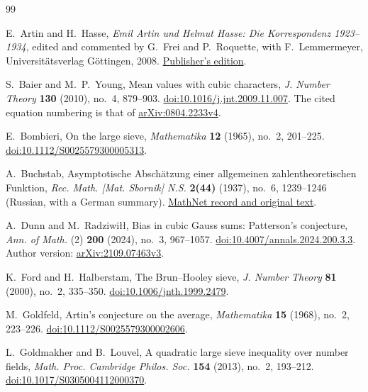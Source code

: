 {}
\begin{thebibliography}{99}
\raggedright
\setlength{\itemsep}{2pt plus 1pt minus 1pt}

E.~Artin and H.~Hasse,
\emph{Emil Artin und Helmut Hasse: Die Korrespondenz 1923--1934},
edited and commented by G.~Frei and P.~Roquette, with F.~Lemmermeyer,
Universit\"atsverlag G\"ottingen, 2008.
\href{https://univerlag.uni-goettingen.de/handle/3/isbn-978-3-940344-50-2}{Publisher's edition}.

S.~Baier and M.~P.~Young,
Mean values with cubic characters,
\emph{J. Number Theory} \textbf{130} (2010), no.~4, 879--903.
\href{https://doi.org/10.1016/j.jnt.2009.11.007}{doi:10.1016/j.jnt.2009.11.007}.
The cited equation numbering is that of
\href{https://arxiv.org/abs/0804.2233v4}{arXiv:0804.2233v4}.

E.~Bombieri,
On the large sieve,
\emph{Mathematika} \textbf{12} (1965), no.~2, 201--225.
\href{https://doi.org/10.1112/S0025579300005313}{doi:10.1112/S0025579300005313}.

A.~Buchstab,
Asymptotische Absch\"atzung einer allgemeinen zahlentheoretischen Funktion,
\emph{Rec. Math. [Mat. Sbornik] N.S.} \textbf{2(44)} (1937), no.~6,
1239--1246 (Russian, with a German summary).
\href{https://www.mathnet.ru/eng/sm5649}{MathNet record and original text}.


A.~Dunn and M.~Radziwi\l{}\l{},
Bias in cubic Gauss sums: Patterson's conjecture,
\emph{Ann. of Math.} (2) \textbf{200} (2024), no.~3, 967--1057.
\href{https://doi.org/10.4007/annals.2024.200.3.3}{doi:10.4007/annals.2024.200.3.3}.
Author version:
\href{https://arxiv.org/abs/2109.07463v3}{arXiv:2109.07463v3}.

K.~Ford and H.~Halberstam,
The Brun--Hooley sieve,
\emph{J. Number Theory} \textbf{81} (2000), no.~2, 335--350.
\href{https://doi.org/10.1006/jnth.1999.2479}{doi:10.1006/jnth.1999.2479}.


M.~Goldfeld,
Artin's conjecture on the average,
\emph{Mathematika} \textbf{15} (1968), no.~2, 223--226.
\href{https://doi.org/10.1112/S0025579300002606}{doi:10.1112/S0025579300002606}.

L.~Goldmakher and B.~Louvel,
A quadratic large sieve inequality over number fields,
\emph{Math. Proc. Cambridge Philos. Soc.} \textbf{154} (2013),
no.~2, 193--212.
\href{https://doi.org/10.1017/S0305004112000370}{doi:10.1017/S0305004112000370}.


\end{thebibliography}
